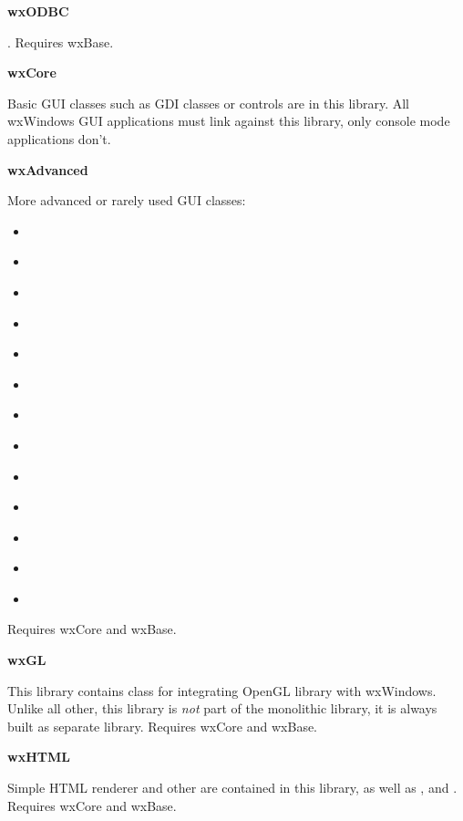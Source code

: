 {\large {\bf wxODBC}}

. Requires wxBase.

{\large {\bf wxCore}}

Basic GUI classes such as GDI classes or controls are in this library. All
wxWindows GUI applications must link against this library, only console mode
applications don't.

{\large {\bf wxAdvanced}}

More advanced or rarely used GUI classes:

\begin{itemize}
\item{  }
\item{  }
\item{  }
\item{  }
\item{  }
\item{  }
\item{  }
\item{  }
\item{  }
\item{  }
\item{  }
\item{  }
\item{  }
\end{itemize}

Requires wxCore and wxBase.

{\large {\bf wxGL}}

This library contains  class for integrating
OpenGL library with wxWindows. Unlike all other, this library is {\em not}
part of the monolithic library, it is always built as separate library.
Requires wxCore and wxBase.

{\large {\bf wxHTML}}

Simple HTML renderer and other  are
contained in this library, as well as
,
 and
. Requires wxCore and wxBase.
